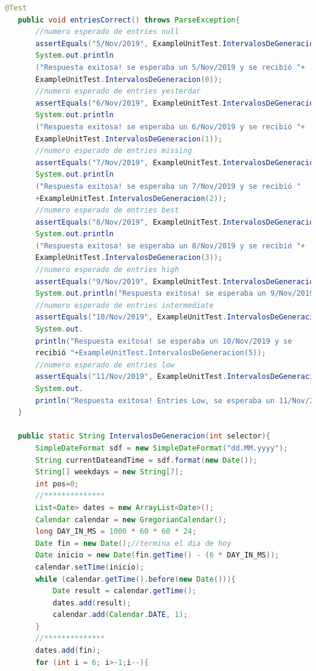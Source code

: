 \begin{lstlisting}[language= Java, frame=single]
   @Test
   public void entriesCorrect() throws ParseException{
       //numero esperado de entries null
       assertEquals("5/Nov/2019", ExampleUnitTest.IntervalosDeGeneracion(0));
       System.out.println
       ("Respuesta exitosa! se esperaba un 5/Nov/2019 y se recibió "+
       ExampleUnitTest.IntervalosDeGeneracion(0));
       //numero esperado de entries yesterdar
       assertEquals("6/Nov/2019", ExampleUnitTest.IntervalosDeGeneracion(1));
       System.out.println
       ("Respuesta exitosa! se esperaba un 6/Nov/2019 y se recibió "+
       ExampleUnitTest.IntervalosDeGeneracion(1));
       //numero esperado de entries missing
       assertEquals("7/Nov/2019", ExampleUnitTest.IntervalosDeGeneracion(2));
       System.out.println
       ("Respuesta exitosa! se esperaba un 7/Nov/2019 y se recibió "
       +ExampleUnitTest.IntervalosDeGeneracion(2));
       //numero esperado de entries best
       assertEquals("8/Nov/2019", ExampleUnitTest.IntervalosDeGeneracion(3));
       System.out.println
       ("Respuesta exitosa! se esperaba un 8/Nov/2019 y se recibió "+
       ExampleUnitTest.IntervalosDeGeneracion(3));
       //numero esperado de entries high
       assertEquals("9/Nov/2019", ExampleUnitTest.IntervalosDeGeneracion(4));
       System.out.println("Respuesta exitosa! se esperaba un 9/Nov/2019 y se recibió "+ExampleUnitTest.IntervalosDeGeneracion(4));
       //numero esperado de entries intermediate
       assertEquals("10/Nov/2019", ExampleUnitTest.IntervalosDeGeneracion(5));
       System.out.
       println("Respuesta exitosa! se esperaba un 10/Nov/2019 y se 
       recibió "+ExampleUnitTest.IntervalosDeGeneracion(5));
       //numero esperado de entries low
       assertEquals("11/Nov/2019", ExampleUnitTest.IntervalosDeGeneracion(6));
       System.out.
       println("Respuesta exitosa! Entries Low, se esperaba un 11/Nov/2019 y se recibió "+ExampleUnitTest.IntervalosDeGeneracion(6));
   }

   public static String IntervalosDeGeneracion(int selector){
       SimpleDateFormat sdf = new SimpleDateFormat("dd.MM.yyyy");
       String currentDateandTime = sdf.format(new Date());
       String[] weekdays = new String[7];
       int pos=0;
       //**************
       List<Date> dates = new ArrayList<Date>();
       Calendar calendar = new GregorianCalendar();
       long DAY_IN_MS = 1000 * 60 * 60 * 24;
       Date fin = new Date();//termina el dia de hoy
       Date inicio = new Date(fin.getTime() - (6 * DAY_IN_MS));
       calendar.setTime(inicio);
       while (calendar.getTime().before(new Date())){
           Date result = calendar.getTime();
           dates.add(result);
           calendar.add(Calendar.DATE, 1);
       }
       //**************
       dates.add(fin);
       for (int i = 6; i>-1;i--){


\end{lstlisting}
